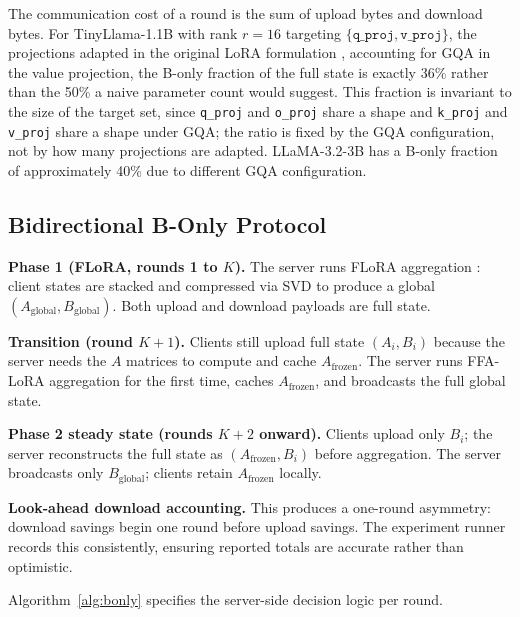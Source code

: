 The communication cost of a round is the sum of upload bytes and download bytes. For TinyLlama-1.1B with rank $r{=}16$ targeting $\{\texttt{q\_proj}, \texttt{v\_proj}\}$, the projections adapted in the original LoRA formulation \citep{hu2022lora}, accounting for GQA in the value projection, the B-only fraction of the full state is exactly 36\% rather than the 50\% a naive parameter count would suggest. This fraction is invariant to the size of the target set, since \texttt{q\_proj} and \texttt{o\_proj} share a shape and \texttt{k\_proj} and \texttt{v\_proj} share a shape under GQA; the ratio is fixed by the GQA configuration, not by how many projections are adapted. LLaMA-3.2-3B has a B-only fraction of approximately 40\% due to different GQA configuration.

\subsection{Bidirectional B-Only Protocol}
\textbf{Phase 1 (FLoRA, rounds 1 to $K$).}
The server runs FLoRA aggregation \citep{wang2024flora}: client states are stacked and compressed via SVD to produce a global $(A_{\text{global}}, B_{\text{global}})$. Both upload and download payloads are full state.

\textbf{Transition (round $K{+}1$).}
Clients still upload full state $(A_i, B_i)$ because the server needs the $A$ matrices to compute and cache $A_{\text{frozen}}$. The server runs FFA-LoRA \citep{sun2024ffalora} aggregation for the first time, caches $A_{\text{frozen}}$, and broadcasts the full global state.

\textbf{Phase 2 steady state (rounds $K{+}2$ onward).}
Clients upload only $B_i$; the server reconstructs the full state as $(A_{\text{frozen}}, B_i)$ before aggregation. The server broadcasts only $B_{\text{global}}$; clients retain $A_{\text{frozen}}$ locally.

\textbf{Look-ahead download accounting.}
This produces a one-round asymmetry: download savings begin one round before upload savings. The experiment runner records this consistently, ensuring reported totals are accurate rather than optimistic.

Algorithm~\ref{alg:bonly} specifies the server-side decision logic per round.

